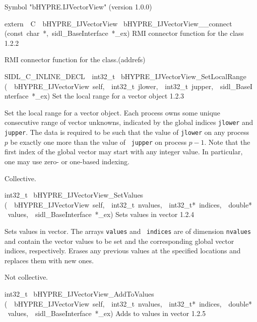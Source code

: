 \documentclass{article}
\begin{document}
\begin{cxxentry}
\begin{cxxentry}
\begin{cxxvariable}
\begin{cxxdoc}
Symbol "bHYPRE.IJVectorView" (version 1.0.0)
\end{cxxdoc}
\end{cxxvariable}
\begin{cxxfunction}
{extern\ \ C\ \ bHYPRE\_IJVectorView\ }
        {bHYPRE\_IJVectorView\_\_connect}
        {(const\ char\ *,\ sidl\_BaseInterface\ *\_ex)}
        {
RMI connector function for the class}
        {1.2.2}
\begin{cxxdoc}

RMI connector function for the class.(addrefs)
\end{cxxdoc}
\end{cxxfunction}
\begin{cxxfunction}
{SIDL\_C\_INLINE\_DECL\ \ int32\_t\ }
        {bHYPRE\_IJVectorView\_SetLocalRange}
        {(\ \ bHYPRE\_IJVectorView\ self,\ \ int32\_t\ jlower,\ \ int32\_t\ jupper,\ \ sidl\_BaseInterface\ *\_ex)}
        {
Set the local range for a vector object}
        {1.2.3}
\begin{cxxdoc}

Set the local range for a vector object.  Each process owns
some unique consecutive range of vector unknowns, indicated
by the global indices {\tt jlower} and {\tt jupper}.  The
data is required to be such that the value of {\tt jlower} on
any process $p$ be exactly one more than the value of {\tt
jupper} on process $p-1$.  Note that the first index of the
global vector may start with any integer value.  In
particular, one may use zero- or one-based indexing.

Collective.
\end{cxxdoc}
\end{cxxfunction}
\begin{cxxfunction}
{int32\_t\ }
        {bHYPRE\_IJVectorView\_SetValues}
        {(\ \ bHYPRE\_IJVectorView\ self,\ \ int32\_t\ nvalues,\ \ int32\_t*\ indices,\ \ double*\ values,\ \ sidl\_BaseInterface\ *\_ex)}
        {
Sets values in vector}
        {1.2.4}
\begin{cxxdoc}

Sets values in vector.  The arrays {\tt values} and {\tt
indices} are of dimension {\tt nvalues} and contain the
vector values to be set and the corresponding global vector
indices, respectively.  Erases any previous values at the
specified locations and replaces them with new ones.

Not collective.
\end{cxxdoc}
\end{cxxfunction}
\begin{cxxfunction}
{int32\_t\ }
        {bHYPRE\_IJVectorView\_AddToValues}
        {(\ \ bHYPRE\_IJVectorView\ self,\ \ int32\_t\ nvalues,\ \ int32\_t*\ indices,\ \ double*\ values,\ \ sidl\_BaseInterface\ *\_ex)}
        {
Adds to values in vector}
        {1.2.5}
\begin{cxxdoc}


\end{cxxdoc}
\end{cxxfunction}
\end{cxxentry}
\end{cxxentry}
\end{document}
